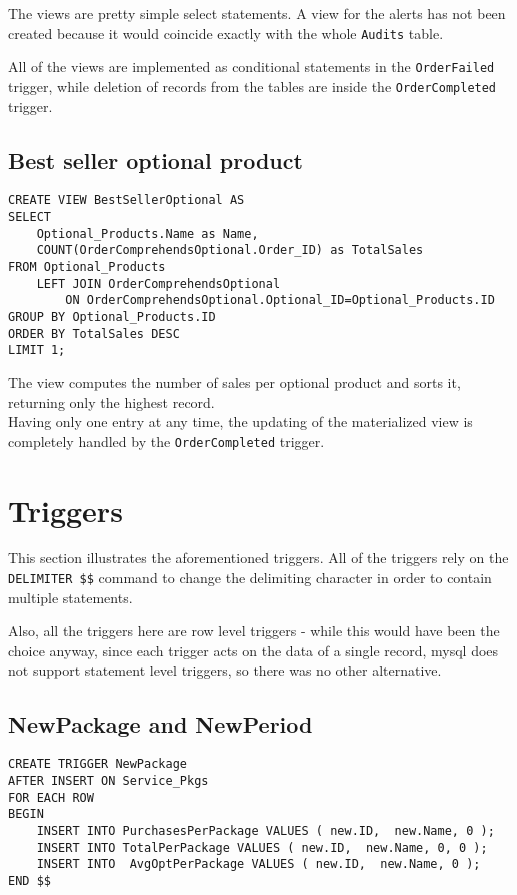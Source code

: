 The views are pretty simple select statements. A view for the alerts has not been created because it would coincide exactly with the
whole \texttt{Audits} table.

All of the views are implemented as conditional statements in the \texttt{OrderFailed}  trigger, while deletion of records from the tables are
inside the \texttt{OrderCompleted} trigger.

\subsection{Best seller optional product}

\begin{lstlisting}[style=SQL]
CREATE VIEW BestSellerOptional AS
SELECT
    Optional_Products.Name as Name,
    COUNT(OrderComprehendsOptional.Order_ID) as TotalSales
FROM Optional_Products
    LEFT JOIN OrderComprehendsOptional
        ON OrderComprehendsOptional.Optional_ID=Optional_Products.ID
GROUP BY Optional_Products.ID
ORDER BY TotalSales DESC
LIMIT 1;
\end{lstlisting}

The view computes the number of sales per optional product and sorts it, returning only the highest record.\\

Having only one entry at any time, the updating of the materialized view is completely handled by the \texttt{OrderCompleted} trigger.


\section{Triggers}
\label{sec:triggers}

This section illustrates the aforementioned triggers. All of the triggers rely on the \texttt{DELIMITER \$\$} command to change the delimiting character in order to contain multiple statements.

Also, all the triggers here are row level triggers - while this would have been the choice anyway, since each trigger acts on the data of a single record, mysql does not support statement level triggers, so there was no other alternative.

\subsection {NewPackage and NewPeriod}


\begin{lstlisting}[style=SQL]
CREATE TRIGGER NewPackage
AFTER INSERT ON Service_Pkgs
FOR EACH ROW
BEGIN
    INSERT INTO PurchasesPerPackage VALUES ( new.ID,  new.Name, 0 );
    INSERT INTO TotalPerPackage VALUES ( new.ID,  new.Name, 0, 0 );
    INSERT INTO  AvgOptPerPackage VALUES ( new.ID,  new.Name, 0 );
END $$
\end{lstlisting}

